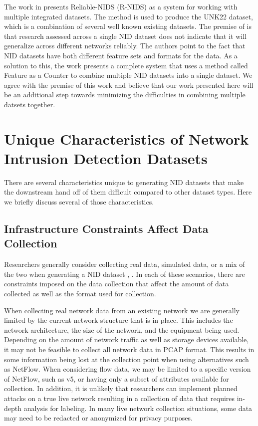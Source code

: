 \documentclass[conference]{IEEEtran}
\begin{document}
The work in \cite{9787094} presents Reliable-NIDS (R-NIDS) as a system for working with multiple integrated datasets.
The method is used to produce the UNK22 dataset, which is a combination of several well known existing datasets.
The premise of \cite{9787094} is that research assessed across a single NID dataset does not indicate that it will generalize across different networks reliably.
The authors point to the fact that NID datasets have both different feature sets and formats for the data.
As a solution to this, the work presents a complete system that uses a method called Feature as a Counter to combine multiple NID datasets into a single dataset.
We agree with the premise of this work and believe that our work presented here will be an additional step towards minimizing the difficulties in combining multiple datsets together.

\section{Unique Characteristics of Network Intrusion Detection Datasets}\label{sec:characteristics}
There are several characteristics unique to generating NID  datasets that make the downstream hand off of them difficult compared to other dataset types.
Here we briefly discuss several of those characteristics.

\subsection{Infrastructure Constraints Affect Data Collection}\label{subsec:infrastructure}
Researchers generally consider collecting real data, simulated data, or a mix of the two when generating a NID dataset \cite{Chou2022}, \cite{ring2019survey}. 
In each of these scenarios, there are constraints imposed on the data collection that affect the amount of data collected as well as the format used for collection.

When collecting real network data from an existing network we are generally limited by the current network structure that is in place.
This includes the network architecture, the size of the network, and the equipment being used.
Depending on the amount of network traffic as well as storage devices available, it may not be feasible to collect all network data in PCAP format.
This results in some information being lost at the collection point when using alternatives such as NetFlow.
When considering flow data, we may be limited to a specific version of NetFlow, such as v5, or having only a subset of attributes available for collection.
In addition, it is unlikely that researchers can implement planned attacks on a true live network resulting in a collection of data that requires in-depth analysis for labeling.
In many live network collection situations, some data may need to be redacted or anonymized for privacy purposes.
\end{document}
